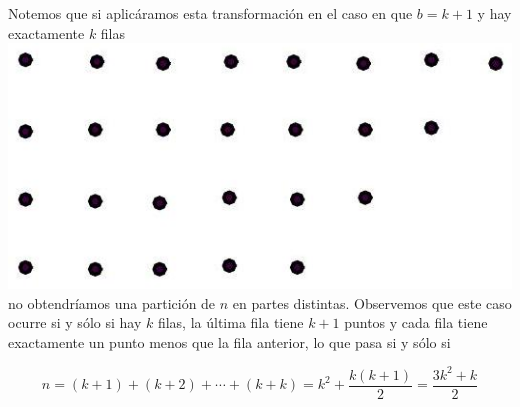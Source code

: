 \documentclass[10pt]{article}
\begin{document}
Notemos que si aplicáramos esta transformación en el caso en que $b=k+1$ y hay exactamente $k$ filas\\
\includegraphics[max width=\textwidth, center]{2025_09_05_3ba26226ec0baddb5a03g-36(2)}\\
no obtendríamos una partición de $n$ en partes distintas. Observemos que este caso ocurre si y sólo si hay $k$ filas, la última fila tiene $k+1$ puntos y cada fila tiene exactamente un punto menos que la fila anterior, lo que pasa si y sólo si

$$
n=(k+1)+(k+2)+\cdots+(k+k)=k^{2}+\frac{k(k+1)}{2}=\frac{3 k^{2}+k}{2}
$$
\end{document}
